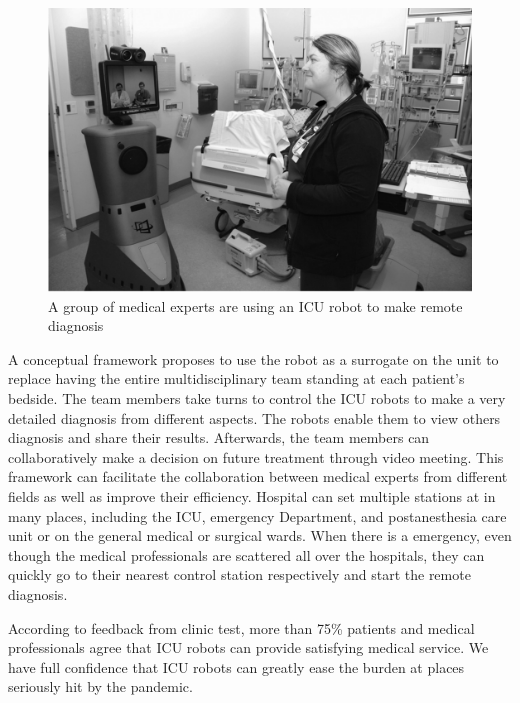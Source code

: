 \documentclass[a4paper]{article}
\begin{document}
\begin{figure}[H]
    \centering
    \includegraphics[scale=0.2]{ICU.png}
    \caption{A group of medical experts are using an ICU robot to make remote diagnosis}
    \label{ICU}
\end{figure}
\par 
    A conceptual framework proposes to use the robot as a surrogate on the unit to replace having the entire multidisciplinary team standing at each patient's bedside\cite{12}. The team members take turns to control the ICU robots to make a very detailed diagnosis from different aspects. The robots enable them to view others diagnosis and share their results. Afterwards, the team members can collaboratively make a decision on future treatment through video meeting. This framework can facilitate the collaboration between medical experts from different fields as well as improve their efficiency. Hospital can set multiple stations at in many places, including the ICU, emergency Department, and postanesthesia care unit or on the general medical or surgical wards\cite{13}. When there is a emergency, even though the medical professionals are scattered all over the hospitals, they can quickly go to their nearest control station respectively and start the remote diagnosis. 
\par 
    According to feedback from clinic test, more than 75\% patients and medical professionals agree that ICU robots can provide satisfying medical service. We have full confidence that ICU robots can greatly ease the burden at places seriously hit by the pandemic.
\end{document}
